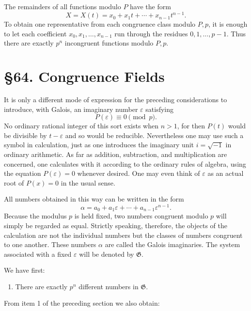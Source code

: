 \documentclass[11pt,a4paper]{article}
\newcommand{\webersection}[2]{\section*{\S #1. #2}\addcontentsline{toc}{section}{\S #1. #2}}
\begin{document}
The remainders of all functions modulo \(P\) have the form
\begin{equation}\label{eq:63-7}
 X=X(t)=x_0+x_1t+\cdots+x_{n-1}t^{n-1}.
\end{equation}
To obtain one representative from each congruence class modulo \(P,p\), it is enough to let each coefficient \(x_0,x_1,\ldots,x_{n-1}\) run through the residues \(0,1,\ldots,p-1\).  Thus there are exactly \(p^n\) incongruent functions modulo \(P,p\).

\webersection{64}{Congruence Fields}

It is only a different mode of expression for the preceding considerations to introduce, with Galois, an imaginary number \(\varepsilon\) satisfying
\begin{equation}\label{eq:64-1}
 P(\varepsilon)\equiv0\pmod p.
\end{equation}
No ordinary rational integer of this sort exists when \(n>1\), for then \(P(t)\) would be divisible by \(t-\varepsilon\) and so would be reducible.  Nevertheless one may use such a symbol in calculation, just as one introduces the imaginary unit \(i=\sqrt{-1}\) in ordinary arithmetic.  As far as addition, subtraction, and multiplication are concerned, one calculates with it according to the ordinary rules of algebra, using the equation \(P(\varepsilon)=0\) whenever desired.  One may even think of \(\varepsilon\) as an actual root of \(P(x)=0\) in the usual sense.

All numbers obtained in this way can be written in the form
\begin{equation}\label{eq:64-2}
 \alpha=a_0+a_1\varepsilon+\cdots+a_{n-1}\varepsilon^{n-1}.
\end{equation}
Because the modulus \(p\) is held fixed, two numbers congruent modulo \(p\) will simply be regarded as equal.  Strictly speaking, therefore, the objects of the calculation are not the individual numbers but the classes of numbers congruent to one another.  These numbers \(\alpha\) are called the Galois imaginaries.  The system associated with a fixed \(\varepsilon\) will be denoted by \(\mathfrak G\).

We have first:

\begin{enumerate}[label=\arabic*.,resume]
\item There are exactly \(p^n\) different numbers in \(\mathfrak G\).
\end{enumerate}
From item 1 of the preceding section we also obtain:
\end{document}
